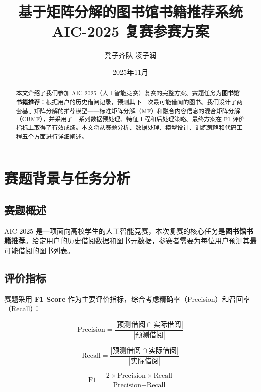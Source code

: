 \documentclass[12pt,a4paper]{article}
\title{\textbf{基于矩阵分解的图书馆书籍推荐系统}\\[0.5em]
\large AIC-2025 复赛参赛方案}
\author{凳子齐队 \quad 凌子润}
\date{2025年11月}
\begin{document}
\maketitle

\begin{abstract}
本文介绍了我们参加 AIC-2025（人工智能竞赛）复赛的完整方案。赛题任务为\textbf{图书馆书籍推荐}：根据用户的历史借阅记录，预测其下一次最可能借阅的图书。我们设计了两套基于矩阵分解的推荐模型——标准矩阵分解（MF）和融合内容信息的混合矩阵分解（CBMF），并采用了一系列数据预处理、特征工程和后处理策略。最终方案在 F1 评价指标上取得了有效成绩。本文将从赛题分析、数据处理、模型设计、训练策略和代码工程五个方面进行详细阐述。
\end{abstract}

\tableofcontents
\newpage

\section{赛题背景与任务分析}

\subsection{赛题概述}

AIC-2025 是一项面向高校学生的人工智能竞赛，本次复赛的核心任务是\textbf{图书馆书籍推荐}。给定用户的历史借阅数据和图书元数据，参赛者需要为每位用户预测其最可能借阅的图书列表。

\subsection{评价指标}

赛题采用 \textbf{F1 Score} 作为主要评价指标，综合考虑精确率（Precision）和召回率（Recall）：

\begin{equation}
    \text{Precision} = \frac{|\text{预测借阅} \cap \text{实际借阅}|}{|\text{预测借阅}|}
\end{equation}

\begin{equation}
    \text{Recall} = \frac{|\text{预测借阅} \cap \text{实际借阅}|}{|\text{实际借阅}|}
\end{equation}

\begin{equation}
    \text{F1} = \frac{2 \times \text{Precision} \times \text{Recall}}{\text{Precision} + \text{Recall}}
\end{equation}
\end{document}
